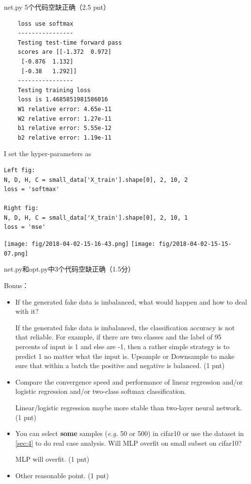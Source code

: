 \documentclass[12pt]{article}
\begin{document}
net.py 5个代码空缺正确（2.5 pnt）

\begin{verbatim}
	loss use softmax
	----------------
	Testing test-time forward pass
	scores are [[-1.372  0.972]
	 [-0.876  1.132]
	 [-0.38   1.292]]
	----------------
	Testing training loss
	loss is 1.4685851981586016
	W1 relative error: 4.65e-11
	W2 relative error: 1.27e-11
	b1 relative error: 5.55e-12
	b2 relative error: 1.19e-11	
\end{verbatim}

I set the hyper-parameters as
\begin{verbatim}
Left fig: 
N, D, H, C = small_data['X_train'].shape[0], 2, 10, 2
loss = 'softmax'

Right fig:
N, D, H, C = small_data['X_train'].shape[0], 2, 10, 1
loss = 'mse'
\end{verbatim}

\begin{center}
	\texttt{[image: fig/2018-04-02-15-16-43.png]}
	\texttt{[image: fig/2018-04-02-15-15-07.png]}
\end{center}

net.py和opt.py中3个代码空缺正确（1.5分）

Bonus：
\begin{itemize}
	\item If the generated fake data is imbalanced, what would happen and how to deal with it?

	      If the generated fake data is imbalanced, the classification accuracy is not that
	      reliable.  For example, if there are two classes and the label of
	      95 percents of input is 1 and else are -1, then a rather simple strategy is to
	      predict 1 no matter what  the input is.  Upsample or Downsample to make sure that within a batch the positive and negative is balanced.   (1 pnt)
	\item
	      Compare the convergence speed and performance of  linear regression and/or logistic regression and/or two-class softmax classification.

	      Linear/logistic regression maybe more stable than two-layer neural network. (1 pnt) 

	\item
	      You can select \textbf{some} samples (\textit{e.g.} 50 or 500) in cifar10 or use the dataset in {\ref{sec:4}} to do real case analysis. Will MLP overfit on small subset on cifar10?

		MLP will overfit.  (1 pnt)
	\item
	      Other reasonable point. (1 pnt)
\end{itemize}
\end{document}
